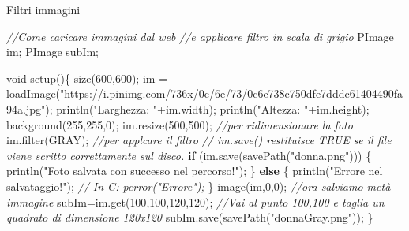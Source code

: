 \documentclass[
]{article}
\newenvironment{Shaded}{}{}
\newcommand{\CommentTok}[1]{\textcolor[rgb]{0.38,0.63,0.69}{\textit{#1}}}
\newcommand{\ControlFlowTok}[1]{\textcolor[rgb]{0.00,0.44,0.13}{\textbf{#1}}}
\newcommand{\DataTypeTok}[1]{\textcolor[rgb]{0.56,0.13,0.00}{#1}}
\newcommand{\DecValTok}[1]{\textcolor[rgb]{0.25,0.63,0.44}{#1}}
\newcommand{\FunctionTok}[1]{\textcolor[rgb]{0.02,0.16,0.49}{#1}}
\newcommand{\NormalTok}[1]{#1}
\newcommand{\OperatorTok}[1]{\textcolor[rgb]{0.40,0.40,0.40}{#1}}
\newcommand{\StringTok}[1]{\textcolor[rgb]{0.25,0.44,0.63}{#1}}
\begin{document}
Filtri immagini

\begin{Shaded}
\begin{Highlighting}[]
\CommentTok{//Come caricare immagini dal web}
\CommentTok{//e applicare filtro in scala di grigio}
\NormalTok{PImage im}\OperatorTok{;}
\NormalTok{PImage subIm}\OperatorTok{;}

\DataTypeTok{void} \FunctionTok{setup}\OperatorTok{()\{}
 \FunctionTok{size}\OperatorTok{(}\DecValTok{600}\OperatorTok{,}\DecValTok{600}\OperatorTok{);}
\NormalTok{ im }\OperatorTok{=} \FunctionTok{loadImage}\OperatorTok{(}\StringTok{"https://i.pinimg.com/736x/0c/6e/73/0c6e738c750dfe7dddc61404490fa94a.jpg"}\OperatorTok{);}
 \FunctionTok{println}\OperatorTok{(}\StringTok{"Larghezza: "}\OperatorTok{+}\NormalTok{im}\OperatorTok{.}\FunctionTok{width}\OperatorTok{);}
 \FunctionTok{println}\OperatorTok{(}\StringTok{"Altezza: "}\OperatorTok{+}\NormalTok{im}\OperatorTok{.}\FunctionTok{height}\OperatorTok{);}
 \FunctionTok{background}\OperatorTok{(}\DecValTok{255}\OperatorTok{,}\DecValTok{255}\OperatorTok{,}\DecValTok{0}\OperatorTok{);}
\NormalTok{ im}\OperatorTok{.}\FunctionTok{resize}\OperatorTok{(}\DecValTok{500}\OperatorTok{,}\DecValTok{500}\OperatorTok{);} \CommentTok{//per ridimensionare la foto}
\NormalTok{ im}\OperatorTok{.}\FunctionTok{filter}\OperatorTok{(}\NormalTok{GRAY}\OperatorTok{);} \CommentTok{//per applcare il filtro}
\CommentTok{// im.save() restituisce TRUE se il file viene scritto correttamente sul disco.}
  \ControlFlowTok{if} \OperatorTok{(}\NormalTok{im}\OperatorTok{.}\FunctionTok{save}\OperatorTok{(}\FunctionTok{savePath}\OperatorTok{(}\StringTok{"donna.png"}\OperatorTok{)))} \OperatorTok{\{}
    \FunctionTok{println}\OperatorTok{(}\StringTok{"Foto salvata con successo nel percorso!"}\OperatorTok{);}
  \OperatorTok{\}} \ControlFlowTok{else} \OperatorTok{\{}
    \FunctionTok{println}\OperatorTok{(}\StringTok{"Errore nel salvataggio!"}\OperatorTok{);} \CommentTok{// In C: perror("Errore");}
  \OperatorTok{\}}
 \FunctionTok{image}\OperatorTok{(}\NormalTok{im}\OperatorTok{,}\DecValTok{0}\OperatorTok{,}\DecValTok{0}\OperatorTok{);}
 \CommentTok{//ora salviamo metà immagine}
\NormalTok{ subIm}\OperatorTok{=}\NormalTok{im}\OperatorTok{.}\FunctionTok{get}\OperatorTok{(}\DecValTok{100}\OperatorTok{,}\DecValTok{100}\OperatorTok{,}\DecValTok{120}\OperatorTok{,}\DecValTok{120}\OperatorTok{);} \CommentTok{//Vai al punto 100,100 e taglia un quadrato di dimensione 120x120}
\NormalTok{ subIm}\OperatorTok{.}\FunctionTok{save}\OperatorTok{(}\FunctionTok{savePath}\OperatorTok{(}\StringTok{"donnaGray.png"}\OperatorTok{));}
\OperatorTok{\}}


\end{Highlighting}
\end{Shaded}
\end{document}
